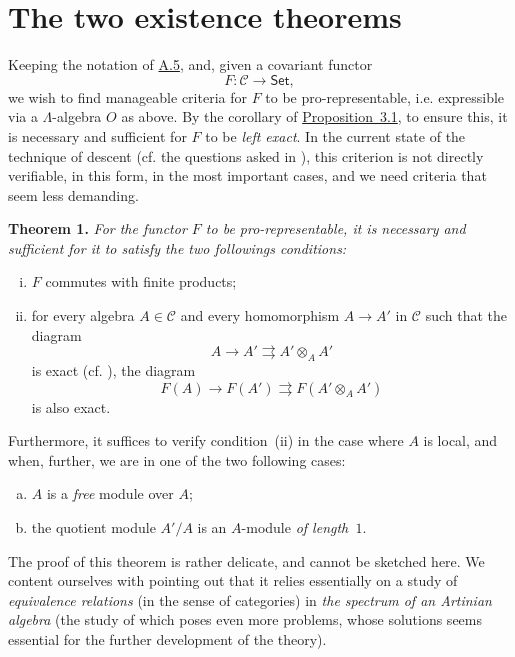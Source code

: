 \documentclass{article}
\newenvironment{itenv}[1]
  {\phantomsection\par\medskip\noindent\textbf{#1.}\itshape}
  {\medskip}
\renewcommand{\cal}[1]{{\mathcal{#1}}}
\newcommand{\Set}{\mathsf{Set}}
\newcommand{\oldpage}[1]{\marginpar{\footnotesize$\Big\vert$ \textit{p.~#1}}}
\begin{document}
\part{The two existence theorems}
\label{B}

Keeping the notation of \hyperref[A.5]{A.5}, and, given a covariant functor
\[
  F\colon \cal{C} \to \Set,
\]
we wish to find manageable criteria for $F$ to be pro-representable, i.e. expressible via a $\Lambda$-algebra $O$ as above.
By the corollary of \hyperref[A.3-proposition1]{Proposition~3.1}, to ensure this, it is necessary and sufficient for $F$ to be \emph{left exact}.
In the current state of the technique of descent (cf. the questions asked in \cite[p.~9]{3}), this criterion is not directly verifiable, in this form, in the most important cases, and we need criteria that seem less demanding.

\begin{itenv}{Theorem 1}
\label{B-theorem1}
  For the functor $F$ to be pro-representable, it is necessary and sufficient for it to satisfy the two followings conditions:
  \begin{enumerate}[(i)]
    \item $F$ commutes with finite products;
    \item for every algebra $A\in\cal{C}$ and every homomorphism $A\to A'$ in $\cal{C}$ such that the diagram
      \[
        A \to A' \rightrightarrows A'\otimes_A A'
      \]
      is exact (cf. \cite[A, Definition~1.2]{3}), the diagram
      \[
        F(A) \to F(A') \rightrightarrows F(A'\otimes_A A')
      \]
\oldpage{195-10}
      is also exact.
  \end{enumerate}

  Furthermore, it suffices to verify condition~(ii) in the case where $A$ is local, and when, further, we are in one of the two following cases:
  \begin{enumerate}[(a)]
    \item $A$ is a \emph{free} module over $A$;
    \item the quotient module $A'/A$ is an $A$-module \emph{of length~$1$}.
  \end{enumerate}
\end{itenv}

The proof of this theorem is rather delicate, and cannot be sketched here.
We content ourselves with pointing out that it relies essentially on a study of \emph{equivalence relations} (in the sense of categories) in \emph{the spectrum of an Artinian algebra} (the study of which poses even more problems, whose solutions seems essential for the further development of the theory).
\end{document}
